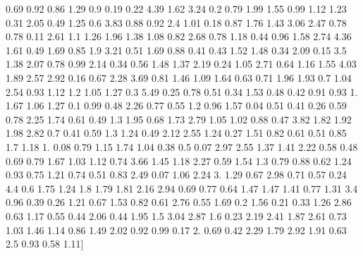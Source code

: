 \documentclass[preview]{standalone}
\begin{document}
\begin{center}
 0.69 0.92 0.86 1.29 0.9  0.19 0.22 4.39 1.62 3.24 0.2  0.79 1.99 1.55
 0.99 1.12 1.23 0.31 2.05 0.49 1.25 0.6  3.83 0.88 0.92 2.4  1.01 0.18
 0.87 1.76 1.43 3.06 2.47 0.78 0.78 0.11 2.61 1.1  1.26 1.96 1.38 1.08
 0.82 2.68 0.78 1.18 0.44 0.96 1.58 2.74 4.36 1.61 0.49 1.69 0.85 1.9
 3.21 0.51 1.69 0.88 0.41 0.43 1.52 1.48 0.34 2.09 0.15 3.5  1.38 2.07
 0.78 0.99 2.14 0.34 0.56 1.48 1.37 2.19 0.24 1.05 2.71 0.64 1.16 1.55
 4.03 1.89 2.57 2.92 0.16 0.67 2.28 3.69 0.81 1.46 1.09 1.64 0.63 0.71
 1.96 1.93 0.7  1.04 2.54 0.93 1.12 1.2  1.05 1.27 0.3  5.49 0.25 0.78
 0.51 0.34 1.53 0.48 0.42 0.91 0.93 1.   1.67 1.06 1.27 0.1  0.99 0.48
 2.26 0.77 0.55 1.2  0.96 1.57 0.04 0.51 0.41 0.26 0.59 0.78 2.25 1.74
 0.61 0.49 1.3  1.95 0.68 1.73 2.79 1.05 1.02 0.88 0.47 3.82 1.82 1.92
 1.98 2.82 0.7  0.41 0.59 1.3  1.24 0.49 2.12 2.55 1.24 0.27 1.51 0.82
 0.61 0.51 0.85 1.7  1.18 1.   0.08 0.79 1.15 1.74 1.04 0.38 0.5  0.07
 2.97 2.55 1.37 1.41 2.22 0.58 0.48 0.69 0.79 1.67 1.03 1.12 0.74 3.66
 1.45 1.18 2.27 0.59 1.54 1.3  0.79 0.88 0.62 1.24 0.93 0.75 1.21 0.74
 0.51 0.83 2.49 0.07 1.06 2.24 3.   1.29 0.67 2.98 0.71 0.57 0.24 4.4
 0.6  1.75 1.24 1.8  1.79 1.81 2.16 2.94 0.69 0.77 0.64 1.47 1.47 1.41
 0.77 1.31 3.4  0.96 0.39 0.26 1.21 0.67 1.53 0.82 0.61 2.76 0.55 1.69
 0.2  1.56 0.21 0.33 1.26 2.86 0.63 1.17 0.55 0.44 2.06 0.44 1.95 1.5
 3.04 2.87 1.6  0.23 2.19 2.41 1.87 2.61 0.73 1.03 1.46 1.14 0.86 1.49
 2.02 0.92 0.99 0.17 2.   0.69 0.42 2.29 1.79 2.92 1.91 0.63 2.5  0.93
 0.58 1.11]
\end{center}
\end{document}
